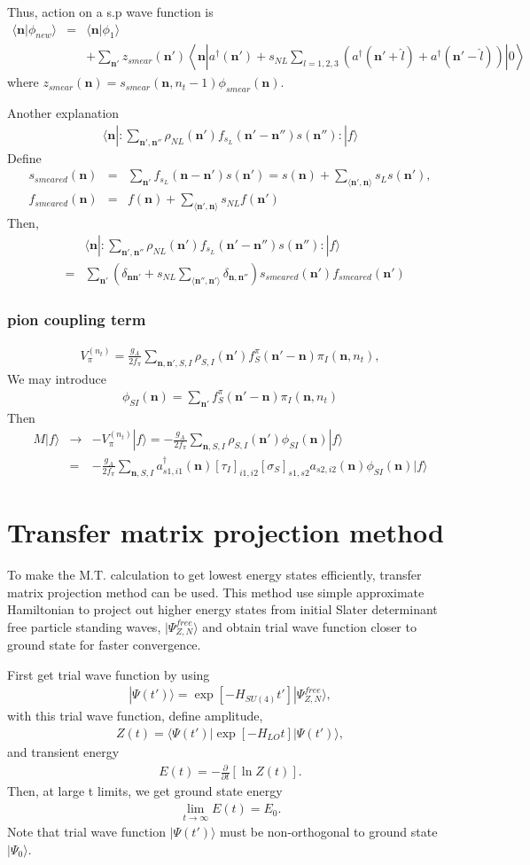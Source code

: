 \documentclass[10pt]{book}
\def\bm{\boldsymbol}
\newcommand{\bea}{\begin{eqnarray}}
\newcommand{\eea}{\end{eqnarray}}
\newcommand{\no}{\nonumber \\}
\newcommand{\del}{\partial}
\def\vn{{\bm n}}
\def\la{\langle}
\def\ra{\rangle}
\begin{document}
Thus, action on a s.p wave function is 
\bea 
\la \vn|\phi_{new}\ra &=& \la \vn|\phi_1\ra  \no 
  & &+ \sum_{\vn'}z_{smear}(\vn')
   \left\la \vn\left| a^\dagger(\vn')+s_{NL}\sum_{l=1,2,3}(a^\dagger(\vn'+\hat{l})+a^\dagger(\vn'-\hat{l})  )   \right|0\right\ra 
\eea 
where $ z_{smear}(\vn)=s_{smear}(\vn,n_t-1) \phi_{smear}(\vn)$.

Another explanation
\bea 
\la \vn|: \sum_{\vn',\vn''} \rho_{NL}(\vn') f_{s_L}(\vn'-\vn'') s(\vn'') :|f\ra 
\eea 
Define
\bea 
s_{smeared}(\vn)&=&\sum_{\vn'}f_{s_L}(\vn-\vn') s(\vn')
=s(\vn) +\sum_{\la \vn',\vn\ra } s_L s(\vn'),  \no 
f_{smeared}(\vn)&=& f(\vn) +\sum_{\la \vn',\vn\ra } s_{NL} f(\vn')                 
\eea 
Then,
\bea 
& & \la \vn|: \sum_{\vn',\vn''} \rho_{NL}(\vn') f_{s_L}(\vn'-\vn'') s(\vn'') :|f\ra  \no 
&=& \sum_{\vn'} \left(\delta_{\vn\vn'}+s_{NL}\sum_{\la \vn'',\vn'\ra }\delta_{\vn,\vn''} \right)
s_{smeared}(\vn') f_{smeared}(\vn')
\eea 


\subsubsection{pion coupling term}
\bea 
V_{\pi}^{(n_t)}=\frac{g_A}{2f_\pi}\sum_{\vn,\vn',S,I}\rho_{S,I}(\vn')f^\pi_S(\vn'-\vn)\pi_I(\vn,n_t),
\eea 
We may introduce 
\bea 
\phi_{SI}(\vn)=\sum_{\vn'} f^\pi_S(\vn'-\vn)\pi_I(\vn,n_t) 
\eea 
Then
\bea 
M|f\ra &\to& -V_{\pi}^{(n_t)}|f\ra = -\frac{g_A}{2f_\pi}\sum_{\vn,S,I}\rho_{S,I}(\vn')\phi_{SI}(\vn)|f\ra 
  \no
  & = &  -\frac{g_A}{2f_\pi}\sum_{\vn,S,I} a^\dagger_{s1,i1}(\vn)[\tau_I]_{i1,i2}[\sigma_S]_{s1,s2}
   a_{s2,i2}(\vn) \phi_{SI}(\vn) |f\ra 
\eea 



\section{Transfer matrix projection method} 
To make the M.T. calculation to get lowest energy states efficiently,
transfer matrix projection method can be used. 
This method use 
simple approximate Hamiltonian to project out higher energy states
from initial Slater determinant free particle standing waves, $|\Psi^{free}_{Z,N}\ra$ 
and obtain trial wave function closer to ground state
for faster convergence. 

First get trial wave function by using
\bea 
|\Psi(t')\ra =\exp[-H_{SU(4)} t']|\Psi^{free}_{Z,N}\ra, 
\eea 
with this trial wave function, define amplitude,
\bea 
Z(t)=\la \Psi(t')|\exp[-H_{LO} t]|\Psi(t')\ra, 
\eea 
and transient energy
\bea 
E(t)=-\frac{\del}{\del t}[\ln Z(t)].
\eea 
Then, at large t limits, we get ground state energy
\bea 
\lim_{t\to \infty} E(t)= E_0.
\eea 
Note that trial wave function $|\Psi(t')\ra $ must be non-orthogonal to ground state $|\Psi_0\ra$.
\end{document}
